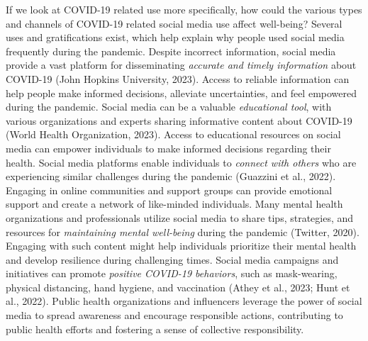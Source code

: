\documentclass[
  man,mask,floatsintext]{apa7}
\begin{document}
If we look at COVID-19 related use more specifically, how could the various types and channels of COVID-19 related social media use affect well-being?
Several uses and gratifications exist, which help explain why people used social media frequently during the pandemic.
Despite incorrect information, social media provide a vast platform for disseminating \emph{accurate and timely information} about COVID-19 (John Hopkins University, 2023).
Access to reliable information can help people make informed decisions, alleviate uncertainties, and feel empowered during the pandemic.
Social media can be a valuable \emph{educational tool}, with various organizations and experts sharing informative content about COVID-19 (World Health Organization, 2023).
Access to educational resources on social media can empower individuals to make informed decisions regarding their health.
Social media platforms enable individuals to \emph{connect with others} who are experiencing similar challenges during the pandemic (Guazzini et al., 2022).
Engaging in online communities and support groups can provide emotional support and create a network of like-minded individuals.
Many mental health organizations and professionals utilize social media to share tips, strategies, and resources for \emph{maintaining mental well-being} during the pandemic (Twitter, 2020).
Engaging with such content might help individuals prioritize their mental health and develop resilience during challenging times.
Social media campaigns and initiatives can promote \emph{positive COVID-19 behaviors}, such as mask-wearing, physical distancing, hand hygiene, and vaccination (Athey et al., 2023; Hunt et al., 2022).
Public health organizations and influencers leverage the power of social media to spread awareness and encourage responsible actions, contributing to public health efforts and fostering a sense of collective responsibility.
\end{document}
